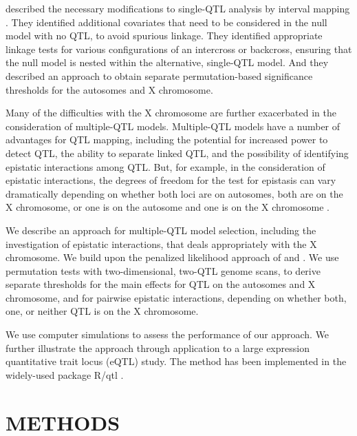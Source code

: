 \documentclass[12pt,letterpaper]{article}
\begin{document}
\citet{Broman2006} described the necessary modifications to single-QTL
analysis by interval mapping \citep{Lander1989}. They identified
additional covariates that need to be considered in the null model
with no QTL, to avoid spurious linkage. They identified appropriate
linkage tests for various configurations of an intercross or
backcross, ensuring that the null model is nested within the
alternative, single-QTL model. And they described an approach to
obtain separate permutation-based significance thresholds for the
autosomes and X chromosome.

Many of the difficulties with the X chromosome are further exacerbated
in the consideration of multiple-QTL models. Multiple-QTL models have
a number of advantages for QTL mapping, including the potential for
increased power to detect QTL, the ability to separate linked QTL, and
the possibility of identifying epistatic interactions among QTL. But,
for example, in the consideration of epistatic interactions, the
degrees of freedom for the test for epistasis can vary dramatically
depending on whether both loci are on autosomes, both are on the X
chromosome, or one is on the autosome and one is on the X chromosome
\citep{Broman2009}.

We describe an approach for multiple-QTL model selection, including
the investigation of epistatic interactions, that deals appropriately
with the X chromosome. We build upon the penalized likelihood approach
of \citet{Broman2002} and \citet{Manichaikul2009}. We use permutation
tests \citep{Churchill1994} with two-dimensional, two-QTL genome
scans, to derive separate thresholds for the main effects for QTL on
the autosomes and X chromosome, and for pairwise epistatic
interactions, depending on whether both, one, or neither QTL is on the
X chromosome.

We use computer simulations to assess the performance of our approach.
We further illustrate the approach through application to a large
expression quantitative trait locus (eQTL) study. The method has been
implemented in the widely-used package R/qtl \citep{Broman2003}.




\clearpage
\section*{METHODS}
\end{document}
